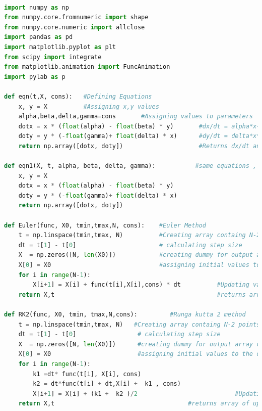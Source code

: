 \documentclass[12pt]{article}
\begin{document}
\begin{lstlisting}[language=Python, caption=Python example]

import numpy as np
from numpy.core.fromnumeric import shape
from numpy.core.numeric import allclose
import pandas as pd
import matplotlib.pyplot as plt
from scipy import integrate
from matplotlib.animation import FuncAnimation 
import pylab as p

def eqn(t,X, cons):   #Defining Equations 
    x, y = X          #Assigning x,y values 
    alpha,beta,delta,gamma=cons       #Assigning values to parameters 
    dotx = x * (float(alpha) - float(beta) * y)       #dx/dt = alpha*x-beta*x*y
    doty = y * (-float(gamma)+ float(delta) * x)      #dy/dt = delta*x*y-gamma*y
    return np.array([dotx, doty])                     #Returns dx/dt and dy/dt in array 

def eqn1(X, t, alpha, beta, delta, gamma):           #same equations , but taking alpha,beta,delta,gamma parameters as input instead of array
    x, y = X                                         
    dotx = x * (float(alpha) - float(beta) * y)
    doty = y * (-float(gamma)+ float(delta) * x)
    return np.array([dotx, doty])

def Euler(func, X0, tmin,tmax,N, cons):    #Euler Method
    t = np.linspace(tmin,tmax, N)          #Creating array containg N-2 points between tmin and tmax (Basically calculation points)
    dt = t[1] - t[0]                       # calculating step size
    X  = np.zeros([N, len(X0)])            #creating dummy for output array containing x,y values
    X[0] = X0                              #assigning initial values to the output array
    for i in range(N-1):
        X[i+1] = X[i] + func(t[i],X[i],cons) * dt          #Updating values of the dummy array that we created 
    return X,t                                             #returns array of updated values of X and array t

def RK2(func, X0, tmin, tmax,N,cons):         #Runga kutta 2 method
    t = np.linspace(tmin,tmax, N)   #Creating array containg N-2 points between tmin and tmax (Basically calculation points)
    dt = t[1] - t[0]                 # calculating step size
    X  = np.zeros([N, len(X0)])      #creating dummy for output array containing x,y values
    X[0] = X0                        #assigning initial values to the output array
    for i in range(N-1):
        k1 =dt* func(t[i], X[i], cons)
        k2 = dt*func(t[i] + dt,X[i] +  k1 , cons)
        X[i+1] = X[i] + (k1 +  k2 )/2                           #Updating values of the dummy array that we created 
    return X,t                                     #returns array of updated values of X and array t


\end{lstlisting}
\end{document}
